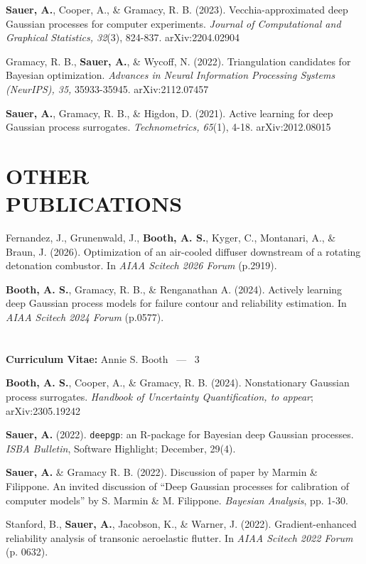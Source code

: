 \documentclass[margin,line,11pt]{res}
\begin{document}
\begin{resume}
{\bf Sauer, A.}, Cooper, A., \& Gramacy, R. B. (2023). Vecchia-approximated
deep Gaussian processes for computer experiments. {\it Journal of Computational
and Graphical Statistics, 32}(3), 824-837. arXiv:2204.02904

Gramacy, R. B., {\bf Sauer, A.}, \& Wycoff, N. (2022). Triangulation 
candidates for Bayesian optimization. {\it Advances in Neural Information
Processing Systems (NeurIPS), 35,} 35933-35945. arXiv:2112.07457

{\bf Sauer, A.}, Gramacy, R. B., \& Higdon, D. (2021). Active learning 
for deep Gaussian process surrogates. {\it Technometrics, 65}(1), 4-18. 
arXiv:2012.08015

\section{OTHER \\ PUBLICATIONS}

Fernandez, J., Grunenwald, J., {\bf Booth, A. S.}, Kyger, C., Montanari, A., \& Braun, J. 
(2026). Optimization of an air-cooled diffuser downstream of a rotating detonation 
combustor. In {\it AIAA Scitech 2026 Forum} (p.2919).

{\bf Booth, A. S.}, Gramacy, R. B., \& Renganathan A. (2024). Actively learning deep Gaussian
process models for failure contour and reliability estimation.  In {\it AIAA Scitech 2024 Forum} (p.0577).

\pagebreak
\section{}
\hfill {\bf Curriculum Vitae:} Annie S. Booth \  --- \  3
\medskip

{\bf Booth, A. S.}, Cooper, A., \& Gramacy, R. B. (2024). Nonstationary
Gaussian process surrogates. {\it Handbook of Uncertainty Quantification, to appear}; arXiv:2305.19242

{\bf Sauer, A.} (2022). {\tt deepgp}: an {\sf R}-package for Bayesian deep Gaussian 
processes.  {\it ISBA Bulletin}, Software Highlight; December, 29(4).

{\bf Sauer, A.} \& Gramacy R. B. (2022). Discussion of paper by Marmin \& Filippone.  An
invited discussion of ``Deep Gaussian processes for calibration of computer models''
by S. Marmin \& M. Filippone. {\it Bayesian Analysis}, pp. 1-30.

Stanford, B., {\bf Sauer, A.}, Jacobson, K., \& Warner, J. (2022). 
Gradient-enhanced reliability analysis of transonic aeroelastic 
flutter. In {\it AIAA Scitech 2022 Forum} (p. 0632).


\end{resume}
\end{document}

